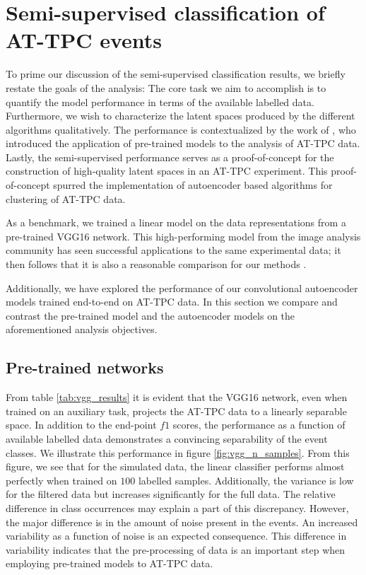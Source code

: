 \section{Semi-supervised classification of AT-TPC events}

To prime our discussion of the semi-supervised classification results, we briefly restate the goals of the analysis: The core task we aim to accomplish is to quantify the model performance in terms of the available labelled data. Furthermore, we wish to characterize the latent spaces produced by the different algorithms qualitatively. The performance is contextualized by the work of \citet{Kuchera2019}, who introduced the application of pre-trained models to the analysis of AT-TPC data. Lastly, the semi-supervised performance serves as a proof-of-concept for the construction of high-quality latent spaces in an AT-TPC experiment. This proof-of-concept spurred the implementation of autoencoder based algorithms for clustering of AT-TPC data.

As a benchmark, we trained a linear model on the data representations from a pre-trained VGG16 network. This high-performing model from the image analysis community has seen successful applications to the same experimental data; it then follows that it is also a reasonable comparison for our methods \cite{Kuchera2019}. 

Additionally, we have explored the performance of our convolutional autoencoder models trained end-to-end on AT-TPC data. In this section we compare and contrast the pre-trained model and the autoencoder models on the aforementioned analysis objectives.

\subsection{Pre-trained networks}

From table \ref{tab:vgg_results} it is evident that the VGG16 network, even when trained on an auxiliary task, projects the AT-TPC data to a linearly separable space. In addition to the end-point $f1$ scores, the performance as a function of available labelled data demonstrates a convincing separability of the event classes. We illustrate this performance in figure \ref{fig:vgg_n_samples}. From this figure, we see that for the simulated data, the linear classifier performs almost perfectly when trained on $100$ labelled samples. Additionally, the variance is low for the filtered data but increases significantly for the full data. The relative difference in class occurrences may explain a part of this discrepancy. However, the major difference is in the amount of noise present in the events. An increased variability as a function of noise is an expected consequence. This difference in variability indicates that the pre-processing of data is an important step when employing pre-trained models to AT-TPC data.


